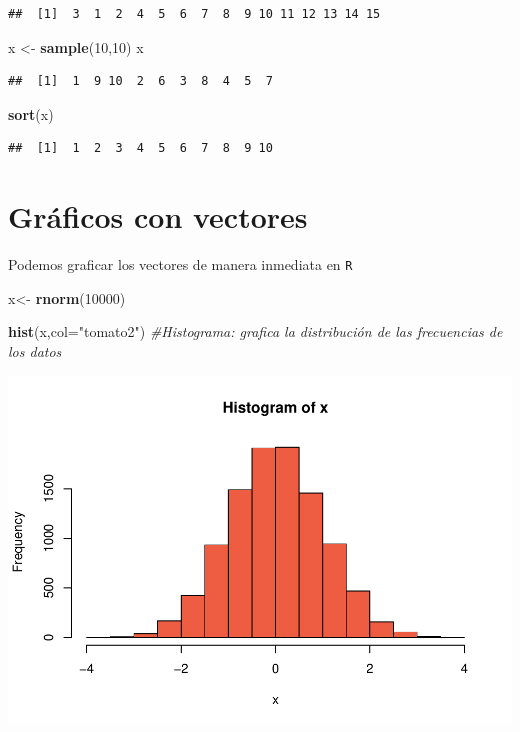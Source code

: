 \documentclass[
]{book}
\newenvironment{Shaded}{\begin{snugshade}}{\end{snugshade}}
\newcommand{\AttributeTok}[1]{\textcolor[rgb]{0.13,0.29,0.53}{#1}}
\newcommand{\CommentTok}[1]{\textcolor[rgb]{0.56,0.35,0.01}{\textit{#1}}}
\newcommand{\DecValTok}[1]{\textcolor[rgb]{0.00,0.00,0.81}{#1}}
\newcommand{\FunctionTok}[1]{\textcolor[rgb]{0.13,0.29,0.53}{\textbf{#1}}}
\newcommand{\NormalTok}[1]{#1}
\newcommand{\OtherTok}[1]{\textcolor[rgb]{0.56,0.35,0.01}{#1}}
\newcommand{\StringTok}[1]{\textcolor[rgb]{0.31,0.60,0.02}{#1}}
\begin{document}
\begin{verbatim}
##  [1]  3  1  2  4  5  6  7  8  9 10 11 12 13 14 15
\end{verbatim}

\begin{Shaded}
\begin{Highlighting}[]
\NormalTok{x }\OtherTok{\textless{}{-}} \FunctionTok{sample}\NormalTok{(}\DecValTok{10}\NormalTok{,}\DecValTok{10}\NormalTok{)}
\NormalTok{x}
\end{Highlighting}
\end{Shaded}

\begin{verbatim}
##  [1]  1  9 10  2  6  3  8  4  5  7
\end{verbatim}

\begin{Shaded}
\begin{Highlighting}[]
\FunctionTok{sort}\NormalTok{(x)}
\end{Highlighting}
\end{Shaded}

\begin{verbatim}
##  [1]  1  2  3  4  5  6  7  8  9 10
\end{verbatim}

\section{Gráficos con vectores}\label{gruxe1ficos-con-vectores}

Podemos graficar los vectores de manera inmediata en \texttt{R}

\begin{Shaded}
\begin{Highlighting}[]
\NormalTok{x}\OtherTok{\textless{}{-}} \FunctionTok{rnorm}\NormalTok{(}\DecValTok{10000}\NormalTok{)}

\FunctionTok{hist}\NormalTok{(x,}\AttributeTok{col=}\StringTok{"tomato2"}\NormalTok{) }\CommentTok{\#Histograma: grafica la distribución de las frecuencias de los datos }
\end{Highlighting}
\end{Shaded}

\includegraphics{bookdown-demo_files/figure-latex/unnamed-chunk-76-1.pdf}
\end{document}
